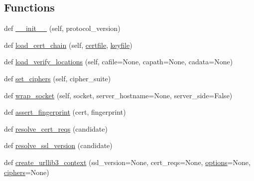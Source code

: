 \subsection*{Functions}
\begin{DoxyCompactItemize}
\item 
def \hyperlink{namespacepip_1_1__vendor_1_1urllib3_1_1util_1_1ssl___a7341a76f234e4a631f8ddc4569cc7e94}{\+\_\+\+\_\+init\+\_\+\+\_\+} (self, protocol\+\_\+version)
\item 
def \hyperlink{namespacepip_1_1__vendor_1_1urllib3_1_1util_1_1ssl___a2381ea3fd57d4f68d29dfddb5a1dd9ee}{load\+\_\+cert\+\_\+chain} (self, \hyperlink{namespacepip_1_1__vendor_1_1urllib3_1_1util_1_1ssl___aca2995b84eedf111317e97c91e894ef5}{certfile}, \hyperlink{namespacepip_1_1__vendor_1_1urllib3_1_1util_1_1ssl___a63fac30b281feb3808f4aaf098f65de9}{keyfile})
\item 
def \hyperlink{namespacepip_1_1__vendor_1_1urllib3_1_1util_1_1ssl___adc941602bd3213e4c3cff39b20ebfcf3}{load\+\_\+verify\+\_\+locations} (self, cafile=None, capath=None, cadata=None)
\item 
def \hyperlink{namespacepip_1_1__vendor_1_1urllib3_1_1util_1_1ssl___a374fdf55fe5c5e5b311a218f90d29460}{set\+\_\+ciphers} (self, cipher\+\_\+suite)
\item 
def \hyperlink{namespacepip_1_1__vendor_1_1urllib3_1_1util_1_1ssl___a22e7b3b7a3b808fcad53f05a05580f79}{wrap\+\_\+socket} (self, socket, server\+\_\+hostname=None, server\+\_\+side=False)
\item 
def \hyperlink{namespacepip_1_1__vendor_1_1urllib3_1_1util_1_1ssl___a43a95083f42fbbe38b44cd5d72bd7431}{assert\+\_\+fingerprint} (cert, fingerprint)
\item 
def \hyperlink{namespacepip_1_1__vendor_1_1urllib3_1_1util_1_1ssl___abdfa9050f36e5884aa19d2106d06f19c}{resolve\+\_\+cert\+\_\+reqs} (candidate)
\item 
def \hyperlink{namespacepip_1_1__vendor_1_1urllib3_1_1util_1_1ssl___a3fd2230196e0721cb2e25bd9def8e7ef}{resolve\+\_\+ssl\+\_\+version} (candidate)
\item 
def \hyperlink{namespacepip_1_1__vendor_1_1urllib3_1_1util_1_1ssl___a5fdbb8af803306826d3389e1ca033ce2}{create\+\_\+urllib3\+\_\+context} (ssl\+\_\+version=None, cert\+\_\+reqs=None, \hyperlink{namespacepip_1_1__vendor_1_1urllib3_1_1util_1_1ssl___a2ecd526c113b46485095d1d8d6fbedee}{options}=None, \hyperlink{namespacepip_1_1__vendor_1_1urllib3_1_1util_1_1ssl___a8cf96bb5b5358ce52fc3624e2cd048d3}{ciphers}=None)
\item 

\end{DoxyCompactItemize}
